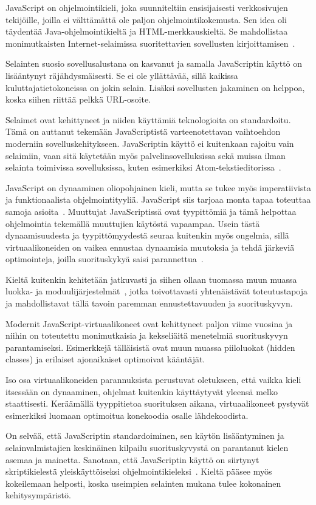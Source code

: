 \noindent
JavaScript on ohjelmointikieli, joka suunniteltiin ensisijaisesti verkkosivujen tekijöille, joilla ei välttämättä ole paljon ohjelmointikokemusta. Sen idea oli täydentää Java-ohjelmointikieltä ja HTML-merkkauskieltä. Se mahdollistaa monimutkaisten Internet-selaimissa suoritettavien sovellusten kirjoittamisen~\cite{paolini1994netscape}.

Selainten suosio sovellusalustana on kasvanut ja samalla JavaScriptin käyttö on lisääntynyt räjähdysmäisesti. Se ei ole yllättävää, sillä kaikissa kuluttajatietokoneissa on jokin selain. Lisäksi sovellusten jakaminen on helppoa, koska siihen riittää pelkkä URL-osoite.

Selaimet ovat kehittyneet ja niiden käyttämiä teknologioita on standardoitu. Tämä on auttanut tekemään JavaScriptistä varteenotettavan vaihtoehdon moderniin sovelluskehitykseen. JavaScriptin käyttö ei kuitenkaan rajoitu vain selaimiin, vaan sitä käytetään myös palvelinsovelluksissa sekä muissa ilman selainta toimivissa sovelluksissa, kuten esimerkiksi Atom-tekstieditorissa~\cite{atom}.

JavaScript on dynaaminen oliopohjainen kieli, mutta se tukee myös imperatiivista ja funktionaalista ohjelmointityyliä. JavaScript siis tarjoaa monta tapaa toteuttaa samoja asioita~\cite[Osio 4.2.1.]{es6}. Muuttujat JavaScriptissä ovat tyypittömiä ja tämä helpottaa ohjelmointia tekemällä muuttujien käytöstä vapaampaa. Usein tästä dynaamisuudesta ja tyypittömyydestä seuraa kuitenkin myös ongelmia, sillä virtuaalikoneiden on vaikea ennustaa dynaamisia muutoksia ja tehdä järkeviä optimointeja, joilla suorituskykyä saisi parannettua~\cite{Ahn2014}.

Kieltä kuitenkin kehitetään jatkuvasti ja siihen ollaan tuomassa muun muassa luokka- ja moduulijärjestelmät~\cite[Osiot~14.5.~ja~15.2.]{es6}, jotka toivottavasti yhtenäistävät toteutustapoja ja mahdollistavat tällä tavoin paremman ennustettavuuden ja suorituskyvyn.

Modernit JavaScript-virtuaalikoneet ovat kehittyneet paljon viime vuosina ja niihin on toteutettu monimutkaisia ja kekseliäitä menetelmiä suorituskyvyn parantamiseksi. Esimerkkejä tälläisistä ovat muun muassa piiloluokat (hidden classes) ja erilaiset ajonaikaiset optimoivat kääntäjät.

Iso osa virtuaalikoneiden parannuksista perustuvat oletukseen, että vaikka kieli itsessään on dynaaminen, ohjelmat kuitenkin käyttäytyvät yleensä melko staattisesti. Keräämällä tyyppitietoa suorituksen aikana, virtuaalikoneet pystyvät esimerkiksi luomaan optimoitua konekoodia osalle lähdekoodista.

On selvää, että JavaScriptin standardoiminen, sen käytön lisääntyminen ja selainvalmistajien keskinäinen kilpailu suorituskyvystä on parantanut kielen asemaa ja mainetta. Sanotaan, että JavaScriptin käyttö on siirtynyt skriptikielestä yleiskäyttöiseksi ohjelmointikieleksi~\cite[Osio~4.]{es6}. Kieltä pääsee myös kokeilemaan helposti, koska useimpien selainten mukana tulee kokonainen kehitysympäristö.